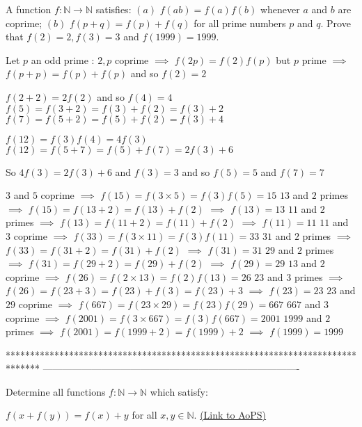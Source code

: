 \begin{solution}
	\begin{tcolorbox}A function $ f: \mathbb{N} \rightarrow \mathbb{N}$ satisfies:
$ (a)$ $ f(ab) = f(a)f(b)$ whenever $ a$ and $ b$ are coprime;
$ (b)$ $ f(p + q) = f(p) + f(q)$ for all prime numbers $ p$ and $ q$.
Prove that $ f(2) = 2,f(3) = 3$ and $ f(1999) = 1999.$\end{tcolorbox}

Let $ p$ an odd prime : $ 2,p$ coprime $ \implies$ $ f(2p)=f(2)f(p)$ but $ p$ prime $ \implies$ $ f(p+p)=f(p)+f(p)$ and so $ f(2)=2$

$ f(2+2)=2f(2)$ and so $ f(4)=4$
$ f(5)=f(3+2)=f(3)+f(2)=f(3)+2$
$ f(7)=f(5+2)=f(5)+f(2)=f(3)+4$

$ f(12)=f(3)f(4)=4f(3)$
$ f(12)=f(5+7)=f(5)+f(7)=2f(3)+6$

So $ 4f(3)=2f(3)+6$ and $ f(3)=3$ and so $ f(5)=5$ and $ f(7)=7$

$ 3$ and $ 5$ coprime $ \implies$ $ f(15)=f(3\times 5)=f(3)f(5)=15$
$ 13$ and $ 2$ primes $ \implies$ $ f(15)=f(13+2)=f(13)+f(2)$ $ \implies$ $ f(13)=13$
$ 11$ and $ 2$ primes $ \implies$ $ f(13)=f(11+2)=f(11)+f(2)$ $ \implies$ $ f(11)=11$
$ 11$ and $ 3$ coprime $ \implies$ $ f(33)=f(3\times 11)=f(3)f(11)=33$
$ 31$ and $ 2$ primes $ \implies$ $ f(33)=f(31+2)=f(31)+f(2)$ $ \implies$ $ f(31)=31$
$ 29$ and $ 2$ primes $ \implies$ $ f(31)=f(29+2)=f(29)+f(2)$ $ \implies$ $ f(29)=29$
$ 13$ and $ 2$ coprime $ \implies$ $ f(26)=f(2\times 13)=f(2)f(13)=26$
$ 23$ and $ 3$ primes $ \implies$ $ f(26)=f(23+3)=f(23)+f(3)=f(23)+3$ $ \implies$ $ f(23)=23$
$ 23$ and $ 29$ coprime $ \implies$ $ f(667)=f(23\times 29)=f(23)f(29)=667$
$ 667$ and $ 3$ coprime $ \implies$ $ f(2001)=f(3\times 667)=f(3)f(667)=2001$
$ 1999$ and $ 2$ primes $ \implies$ $ f(2001)=f(1999+2)=f(1999)+2$ $ \implies$ $ f(1999)=1999$
\end{solution}
*******************************************************************************
-------------------------------------------------------------------------------

\begin{problem}
	Determine all functions $ f: \mathbb{N} \rightarrow \mathbb{N}$ which satisfy:

$ f(x+f(y))=f(x)+y$ for all $ x,y \in \mathbb{N}$.
	\flushright \href{https://artofproblemsolving.com/community/c6h287034}{(Link to AoPS)}
\end{problem}



